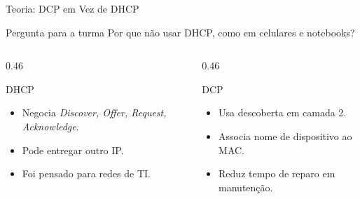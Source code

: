 \documentclass[10pt, aspectratio=169]{beamer}
\begin{document}
\begin{frame}{Teoria: DCP em Vez de DHCP}
    \small
    \begin{block}{Pergunta para a turma}
        Por que n\~ao usar DHCP, como em celulares e notebooks?
    \end{block}

    \begin{columns}[T,totalwidth=\textwidth]
        \begin{column}{0.46\textwidth}
            \begin{block}{DHCP}
                \begin{itemize}
                    \item Negocia \textit{Discover, Offer, Request, Acknowledge}.
                    \item Pode entregar outro IP.
                    \item Foi pensado para redes de TI.
                \end{itemize}
            \end{block}
        \end{column}
        \begin{column}{0.46\textwidth}
            \begin{block}{DCP}
                \begin{itemize}
                    \item Usa descoberta em camada 2.
                    \item Associa nome de dispositivo ao MAC.
                    \item Reduz tempo de reparo em manuten\c{c}\~ao.
                \end{itemize}
            \end{block}
        \end{column}
    \end{columns}
\end{frame}
\end{document}
